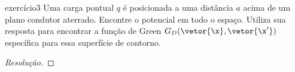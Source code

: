 \begin{exercício}{}{exercício3}
    Uma carga pontual \(q\) é posicionada a uma distância \(a\) acima de um plano condutor aterrado. Encontre o potencial em todo o espaço. Utiliza sua resposta para encontrar a função de Green \(G_D(\vetor{\x}, \vetor{\x'})\) específica para essa superfície de contorno.
\end{exercício}
\begin{proof}[Resolução]

\end{proof}
